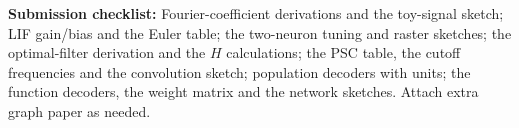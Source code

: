 \documentclass[10pt,letterpaper]{article}
\begin{document}
\vspace{10pt}
\textbf{Submission checklist:} Fourier-coefficient derivations and the toy-signal sketch; LIF gain/bias and the Euler table; the two-neuron tuning and raster sketches; the optimal-filter derivation and the $H$ calculations; the PSC table, the cutoff frequencies and the convolution sketch; population decoders with units; the function decoders, the weight matrix and the network sketches. Attach extra graph paper as needed.
\end{document}
